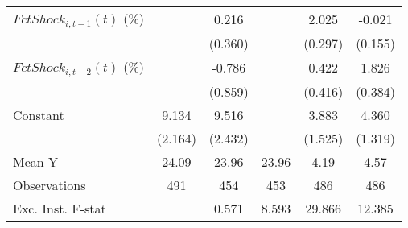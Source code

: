 {\begin{tabular}{l*{5}{c}}
\addlinespace
$ FctShock_{i,t-1}(t)$ (\%)&                     &       0.216         &                     &       2.025\sym{***}&      -0.021         \\
                    &                     &     (0.360)         &                     &     (0.297)         &     (0.155)         \\
\addlinespace
$ FctShock_{i,t-2}(t)$ (\%)&                     &      -0.786         &                     &       0.422         &       1.826\sym{***}\\
                    &                     &     (0.859)         &                     &     (0.416)         &     (0.384)         \\
\addlinespace
Constant            &       9.134\sym{***}&       9.516\sym{***}&                     &       3.883\sym{**} &       4.360\sym{***}\\
                    &     (2.164)         &     (2.432)         &                     &     (1.525)         &     (1.319)         \\
\midrule
Mean Y              &       24.09         &       23.96         &       23.96         &        4.19         &        4.57         \\
Observations        &         491         &         454         &         453         &         486         &         486         \\
Exc. Inst. F-stat   &                     &       0.571         &       8.593         &      29.866         &      12.385         \\
\bottomrule
\end{tabular}
}
